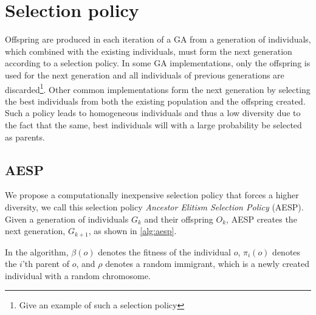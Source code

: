 \section{Selection policy}
Offspring are produced in each iteration of a GA from a generation of individuals, which combined with the existing individuals, must form the next generation according to a selection policy. In some GA implementations, only the offspring is used for the next generation and all individuals of previous generations are discarded\footnote{ Give an example of such a selection policy}. Other common implementations form the next generation by selecting the best individuals from both the existing population and the offspring created\cite{masterThesisGANN}. Such a policy leads to homogeneous individuals and thus a low diversity due to the fact that the same, best individuals will with a large probability be selected as parents.

\subsection{AESP}
We propose a computationally inexpensive selection policy that forces a higher diversity, we call this selection policy \emph{Ancestor Elitism Selection Policy} (AESP). Given a generation of individuals $G_k$ and their offspring $O_k$, AESP creates the next generation, $G_{k+1}$, as shown in \cref{alg:aesp}.
%

%
In the algorithm, $\beta(o)$ denotes the fitness of the individual $o$, $\pi_i(o)$ denotes the $i$'th parent of $o$, and $\rho$ denotes a random immigrant, which is a newly created individual with a random chromosome.
